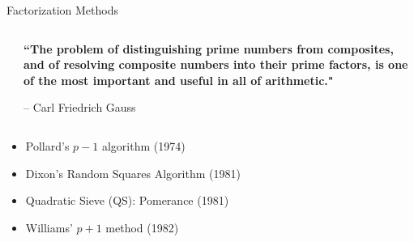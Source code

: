 \documentclass[
	11pt, %
]{beamer}
\begin{document}

\begin{frame}{Factorization Methods}
  
  \begin{columns}[t]
    \begin{column}{.3\textwidth}
    \end{column}
    \begin{column}{.7\textwidth}
      \textbf{``The problem of distinguishing prime numbers from composites, and of resolving composite numbers into their prime factors, is one of the most important and useful in all of arithmetic."}
      
      \hfill-- Carl Friedrich Gauss
    \end{column}
  \end{columns}
  \vspace*{10pt}
  
  \begin{itemize}
  \item Pollard's $p-1$ algorithm (1974)
    \vspace*{10pt}
  \item Dixon's Random Squares Algorithm (1981)
    \vspace*{10pt}
  \item Quadratic Sieve (QS): Pomerance (1981)
    \vspace*{10pt}
  \item Williams' $p+1$ method (1982)
  \end{itemize}
\end{frame}
\end{document}
